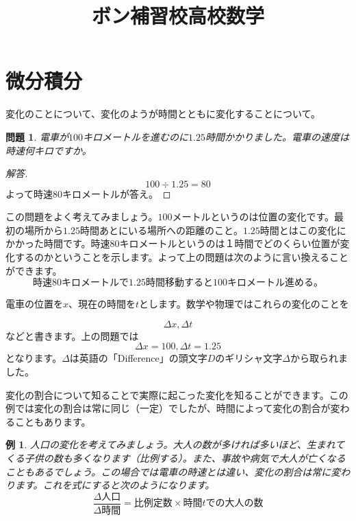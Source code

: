 \documentclass{ltjsarticle}
\title{ボン補習校高校数学}
\author{}
\date{}
\newtheorem{problem}{問題}[section]
\newtheorem{example}{例}[section]
\begin{document}
\maketitle
\section{微分積分}
変化のことについて、変化のようが時間とともに変化することについて。
\begin{problem}
電車が$100$キロメートルを進むのに$1.25$時間かかりました。電車の速度は時速何キロですか。
\end{problem}
\begin{proof}[解答]
\begin{equation*}
100\div 1.25 = 80
\end{equation*}
よって時速$80$キロメートルが答え。
\end{proof}

この問題をよく考えてみましょう。$100$メートルというのは位置の変化です。最初の場所から$1.25$時間あとにいる場所への距離のこと。$1.25$時間とはこの変化にかかった時間です。時速$80$キロメートルというのは１時間でどのくらい位置が変化するのかということを示します。よって上の問題は次のように言い換えることができます。
\begin{equation*}
\text{時速$80$キロメートルで$1.25$時間移動すると$100$キロメートル進める。}
\end{equation*}

電車の位置を$x$、現在の時間を$t$とします。数学や物理ではこれらの変化のことを

\begin{equation*}
\Delta x,\Delta t
\end{equation*}
などと書きます。上の問題では
\begin{equation*}
\Delta x = 100, \Delta t = 1.25
\end{equation*}
となります。$\Delta$は英語の「Difference」の頭文字$D$のギリシャ文字$\Delta$から取られました。

変化の割合について知ることで実際に起こった変化を知ることができます。この例では変化の割合は常に同じ（一定）でしたが、時間によって変化の割合が変わることもあります。
\begin{example}
人口の変化を考えてみましょう。大人の数が多ければ多いほど、生まれてくる子供の数も多くなります（比例する）。また、事故や病気で大人が亡くなることもあるでしょう。この場合では電車の時速とは違い、変化の割合は常に変わります。これを式にすると次のようになります。
\begin{equation*}
{\frac {\Delta\text{人口}}{\Delta\text{時間}}} = \text{比例定数}\times\text{時間$t$での大人の数}
\end{equation*}
\end{example}
\end{document}
